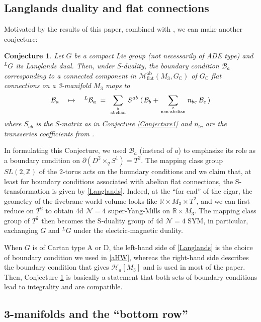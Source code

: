 \documentclass[hyper,letterpaper]{JHEP3}
\newcommand{\be}{\begin{equation}}
\newcommand{\ee}{\end{equation}}
\newcommand{\Z}{{\mathbb Z}}
\newcommand{\R}{{\mathbb R}}
\newcommand{\C}{{\mathbb C}}
\def\CB{{\mathcal B}}
\def\CH{{\mathcal H}}
\def\CM{{\mathcal M}}
\def\CN{{\mathcal N}}
\newtheorem{conj}{Conjecture}[section]
\begin{document}
\subsection{Langlands duality and flat connections}
\label{sec:Langlands}

Motivated by the results of this paper, combined with \cite{Gukov:2016njj}, we can make another conjecture:

\begin{conj}
Let $G$ be a compact Lie group (not necessarily of ADE type) and $^LG$ its Langlands dual.
Then, under S-duality, the boundary condition $\CB_a$ corresponding to a connected component in $\CM_{\text{flat}}^{\text{ab}} (M_3, G_{\C})$
of $G_{\C}$ flat connections on a 3-manifold $M_3$ maps to
\be
\CB_a \quad \mapsto \quad
{}^L\CB_a \; = \; \sum_{{b \atop \text{abelian}}} S^{ab} \; (\, \CB_b + \sum_{{c \atop \text{non-abelian}}} n_{bc} \; \CB_c \, )
\label{Langlands}
\ee
where $S_{ab}$ is the S-matrix as in Conjecture \ref{Conjecture1} and $n_{bc}$ are the transseries coefficients from \cite{Gukov:2016njj}.
\label{conjLanglands}
\end{conj}

In formulating this Conjecture, we used $\CB_a$ (instead of $a$) to emphasize its role as a boundary condition
on $\partial (D^2\times_q S^1) = T^2$. The mapping class group $SL(2,\Z)$ of the 2-torus acts on the boundary
conditions and we claim that, at least for boundary conditions associated with abelian flat connections,
the S-transformation is given by \eqref{Langlands}.
Indeed, at the ``far end'' of the cigar, the geometry of the fivebrane world-volume looks like $\R \times M_3 \times T^2$,
and we can first reduce on $T^2$ to obtain 4d $\CN=4$ super-Yang-Mills on $\R \times M_3$.
The mapping class group of $T^2$ then becomes the S-duality group of 4d $\CN=4$ SYM,
in particular, exchanging $G$ and $^LG$ under the electric-magnetic duality.

When $G$ is of Cartan type A or D, the left-hand side of \eqref{Langlands} is the choice of boundary condition we
used in \eqref{aHW}, whereas the right-hand side describes the boundary condition that gives $\CH_a [M_3]$
and is used in most of the paper. Then, Conjecture \ref{conjLanglands} is basically a statement that both
sets of boundary conditions lead to integrality and are compatible.



\subsection{3-manifolds and the ``bottom row''}
\end{document}
